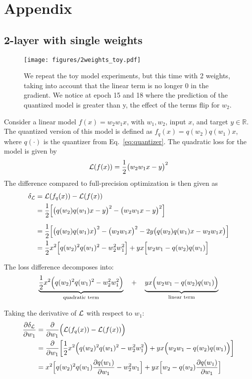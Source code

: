 \section{Appendix}

\subsection{2-layer with single weights}
\label{appendix:multi_layer_qat}
\begin{figure}[H]
    \centering
    \texttt{[image: figures/2weights\_toy.pdf]}
    \hfill
    \caption{We repeat the toy model experiments, but this time with 2 weights, taking into account that the linear term is no longer 0 in the gradient. We notice at epoch 15 and 18 where the prediction of the quantized model is greater than y, the effect of the terms flip for $w_2$.}
\end{figure}
Consider a linear model \( f(x) = w_2 w_1 x \), with \( w_1, w_2 \), input \( x \), and target \( y \in \mathbb{R} \). The quantized version of this model is defined as \( f_q(x) = q(w_2) q(w_1) x \), where \( q(\cdot) \) is the quantizer from Eq.~\ref{eq:quantizer}. The quadratic loss for the model is given by
\[
   \mathcal{L}(f(x)) = \frac{1}{2} \bigl( w_2 w_1 x - y \bigr)^2
\]
The difference compared to full-precision optimization is then given as
\begin{align}
   \delta_{\mathcal{L}} &= \mathcal{L}(f_q(x)) - \mathcal{L}(f(x)) \\
   &= \frac{1}{2} \Bigl[ \bigl( q(w_2) q(w_1) x - y \bigr)^2 
            - \bigl( w_2 w_1 x - y \bigr)^2 \Bigr] \\[6pt]
   &= \frac{1}{2} \Bigl[ \bigl( q(w_2) q(w_1) x \bigr)^2
            - \bigl( w_2 w_1 x \bigr)^2
            - 2y \bigl( q(w_2) q(w_1) x - w_2 w_1 x \bigr) \Bigr] \\
    &= \frac{1}{2} x^2 \Bigl[ q(w_2)^2 q(w_1)^2 - w_2^2 w_1^2 \Bigr]
    + yx \Bigl[ w_2 w_1 - q(w_2) q(w_1) \Bigr]
\end{align}

The loss difference decomposes into:
\[
   \underbrace{\frac{1}{2} x^2 \Bigl( q(w_2)^2 q(w_1)^2 - w_2^2 w_1^2 \Bigr)}_{\text{quadratic term}}
   \quad+\quad
   \underbrace{yx \Bigl( w_2 w_1 - q(w_2) q(w_1) \Bigr)}_{\text{linear term}}
\]

Taking the derivative of \(\mathcal{L}\) with respect to \(w_1\):
\begin{align}
   \frac{\partial \delta_{\mathcal{L}}}{\partial w_1}
   &= \frac{\partial}{\partial w_1}
      \Bigl( \mathcal{L}(f_q(x)) - \mathcal{L}(f(x)) \Bigr) \\
   &= \frac{\partial}{\partial w_1}
      \biggl[
         \frac{1}{2} x^2 \Bigl( q(w_2)^2 q(w_1)^2 - w_2^2 w_1^2 \Bigr)
         +
         yx \Bigl( w_2 w_1 - q(w_2) q(w_1) \Bigr)
      \biggr] \\
   &= x^2 \Bigl[
      q(w_2)^2 q(w_1) \frac{\partial q(w_1)}{\partial w_1}
      - w_2^2 w_1
   \Bigr]
   + yx \Bigl[
      w_2
      - q(w_2) \frac{\partial q(w_1)}{\partial w_1}
   \Bigr]
\end{align}

